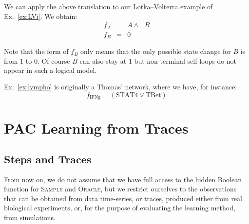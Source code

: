 \documentclass{llncs}
\begin{document}
\begin{example}
   We can apply the above translation to our Lotka--Volterra example of
   Ex.~\ref{ex:LVi}. We obtain:
   \begin{eqnarray*}
   f_A &=& A \wedge\neg B\\
   f_B &=& 0
   \end{eqnarray*}

   Note that the form of $f_B$ only means that the only possible state change
   for $B$ is from $1$ to $0$. Of course $B$ can also stay at $1$ but
   non-terminal self-loops do not appear in such a logical model.
\end{example}

\begin{example}
   Ex.~\ref{ex:lympho} is originally a Thomas' network, where we have, for
   instance:
   \[f_\text{IFNg}=(\text{STAT4}\vee \text{TBet})\]
\end{example}

\section{PAC Learning from Traces} %


\subsection{Steps and Traces}

From now on, we do not assume %
that we have full access to the hidden Boolean function for
\textsc{Sample} and \textsc{Oracle}, but we restrict ourselves to the observations that can be obtained from data time-series, or traces,
produced either from real biological experiments, or, for the purpose of evaluating the learning method, from simulations.
\end{document}
